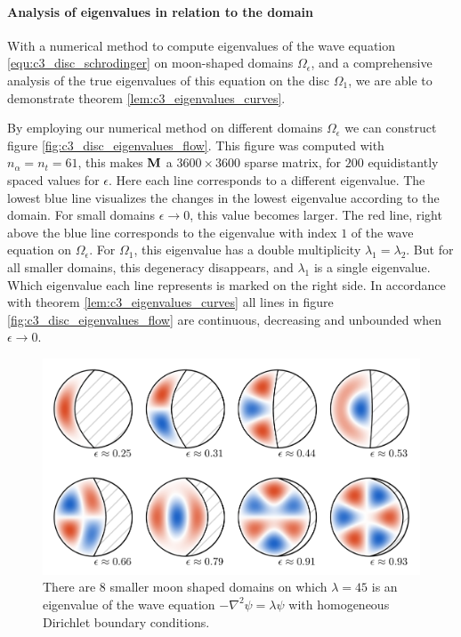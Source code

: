 \paragraph{Analysis of eigenvalues in relation to the domain}

With a numerical method to compute eigenvalues of the wave equation \eqref{equ:c3_disc_schrodinger} on moon-shaped domains $\Omega_\epsilon$, and a comprehensive analysis of the true eigenvalues of this equation on the disc $\Omega_1$, we are able to demonstrate theorem \ref{lem:c3_eigenvalues_curves}.

By employing our numerical method on different domains $\Omega_\epsilon$ we can construct figure \ref{fig:c3_disc_eigenvalues_flow}. This figure was computed with $n_\alpha = n_t = 61$, this makes $\vb{M}$ a $3600\times3600$ sparse matrix, for $200$ equidistantly spaced values for $\epsilon$. Here each line corresponds to a different eigenvalue. The lowest blue line visualizes the changes in the lowest eigenvalue according to the domain. For small domains $\epsilon \to 0$, this value becomes larger. The red line, right above the blue line corresponds to the eigenvalue with index $1$ of the wave equation on $\Omega_\epsilon$. For $\Omega_1$, this eigenvalue has a double multiplicity $\lambda_1 = \lambda_2$. But for all smaller domains, this degeneracy disappears, and $\lambda_1$ is a single eigenvalue. Which eigenvalue each line represents is marked on the right side. In accordance with theorem \ref{lem:c3_eigenvalues_curves} all lines in figure \ref{fig:c3_disc_eigenvalues_flow} are continuous, decreasing and unbounded when $\epsilon \to 0$.


\begin{figure}
  \begin{center}
    \includegraphics[width=\textwidth]{img/chapter3/on_disc/solutions.png}
    \caption{There are $8$ smaller moon shaped domains on which $\lambda = 45$ is an eigenvalue of the wave equation $-\nabla^2 \psi = \lambda \psi$ with homogeneous Dirichlet boundary conditions.}
    \label{fig:c3_disc_solutions}
  \end{center}
\end{figure}


